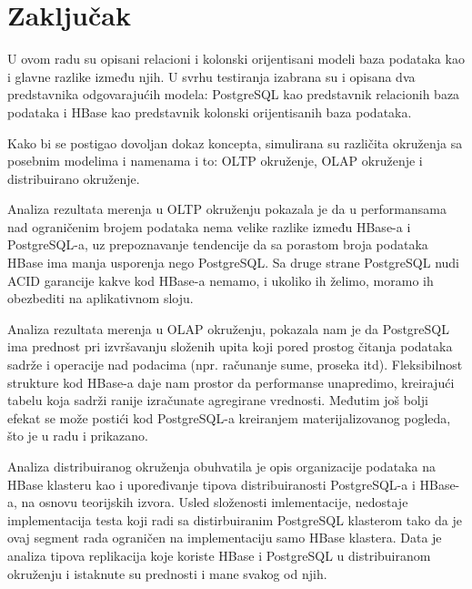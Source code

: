 \documentclass[12pt,oneside]{memoir}
\begin{document}
\chapter{Zaključak}

U ovom radu su opisani relacioni i kolonski orijentisani modeli baza podataka kao i glavne razlike između njih. U svrhu testiranja izabrana su i opisana dva predstavnika odgovarajućih modela: PostgreSQL kao predstavnik relacionih baza podataka i HBase kao predstavnik kolonski orijentisanih baza podataka.

Kako bi se postigao dovoljan dokaz koncepta, simulirana su različita okruženja sa posebnim modelima i namenama i to: OLTP okruženje, OLAP okruženje i distribuirano okruženje.

Analiza rezultata merenja u OLTP okruženju pokazala je da u performansama nad ograničenim brojem podataka nema velike razlike između HBase-a i PostgreSQL-a, uz prepoznavanje tendencije da sa porastom broja podataka HBase ima manja usporenja nego PostgreSQL. Sa druge strane PostgreSQL nudi ACID garancije kakve kod HBase-a nemamo, i ukoliko ih želimo, moramo ih obezbediti na aplikativnom sloju.

Analiza rezultata merenja u OLAP okruženju, pokazala nam je da PostgreSQL ima prednost pri izvršavanju složenih upita koji pored prostog čitanja podataka sadrže i operacije nad podacima (npr. računanje sume, proseka itd). Fleksibilnost strukture kod HBase-a daje nam prostor da performanse unapredimo, kreirajući tabelu koja sadrži ranije izračunate agregirane vrednosti. Međutim još bolji efekat se može postići kod PostgreSQL-a kreiranjem materijalizovanog pogleda, što je u radu i prikazano.

Analiza distribuiranog okruženja obuhvatila je opis organizacije podataka na HBase klasteru kao i upoređivanje tipova distribuiranosti PostgreSQL-a i HBase-a, na osnovu teorijskih izvora. Usled složenosti imlementacije, nedostaje implementacija testa koji radi sa distirbuiranim PostgreSQL klasterom tako da je ovaj segment rada ograničen na implementaciju samo HBase klastera. Data je analiza tipova replikacija koje koriste HBase i PostgreSQL  u distribuiranom okruženju i istaknute su prednosti i mane svakog od njih.

\end{document}
